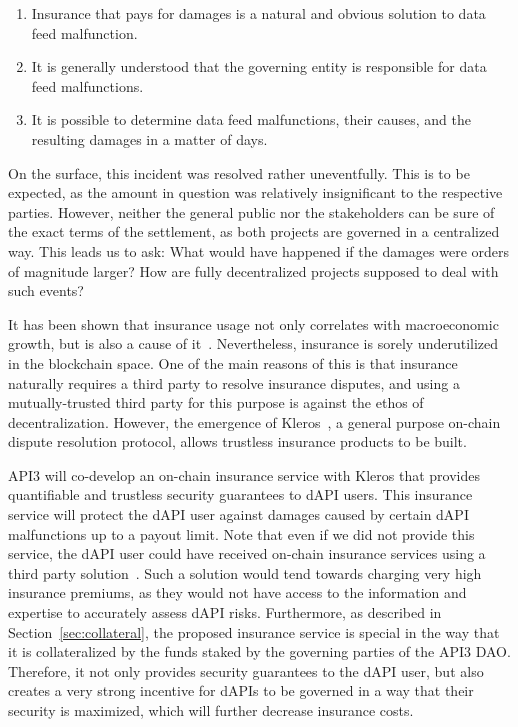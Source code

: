 \documentclass[11pt]{article}
\begin{document}
\begin{enumerate}
    \item Insurance that pays for damages is a natural and obvious solution to data feed malfunction.
    \item It is generally understood that the governing entity is responsible for data feed malfunctions.
    \item It is possible to determine data feed malfunctions, their causes, and the resulting damages in a matter of days.
\end{enumerate}

On the surface, this incident was resolved rather uneventfully.
This is to be expected, as the amount in question was relatively insignificant to the respective parties.
However, neither the general public nor the stakeholders can be sure of the exact terms of the settlement, as both projects are governed in a centralized way.
This leads us to ask: What would have happened if the damages were orders of magnitude larger?
How are fully decentralized projects supposed to deal with such events?

It has been shown that insurance usage not only correlates with macroeconomic growth, but is also a cause of it~\cite{outreville:2013}.
Nevertheless, insurance is sorely underutilized in the blockchain space.
One of the main reasons of this is that insurance naturally requires a third party to resolve insurance disputes, and using a mutually-trusted third party for this purpose is against the ethos of decentralization.
However, the emergence of Kleros~\cite{kleros:2019}, a general purpose on-chain dispute resolution protocol, allows trustless insurance products to be built.

API3 will co-develop an on-chain insurance service with Kleros that provides quantifiable and trustless security guarantees to dAPI users.
This insurance service will protect the dAPI user against damages caused by certain dAPI malfunctions up to a payout limit.
Note that even if we did not provide this service, the dAPI user could have received on-chain insurance services using a third party solution~\cite{nexus-mutual}.
Such a solution would tend towards charging very high insurance premiums, as they would not have access to the information and expertise to accurately assess dAPI risks.
Furthermore, as described in Section~\ref{sec:collateral}, the proposed insurance service is special in the way that it is collateralized by the funds staked by the governing parties of the API3 DAO.
Therefore, it not only provides security guarantees to the dAPI user, but also creates a very strong incentive for dAPIs to be governed in a way that their security is maximized, which will further decrease insurance costs.
\end{document}
